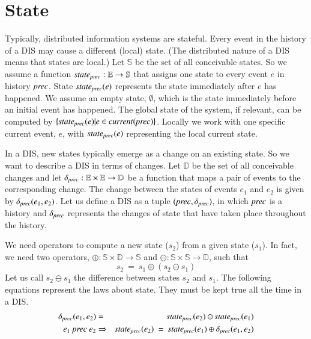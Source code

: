 \documentclass{elsarticle}
\def\id#1{\text{\it #1\/}}
\begin{document}
\section{State}
\label{sct:State}
	Typically, distributed information systems are stateful.
	Every event in the history of a DIS may cause a different (local) state.
	(The distributed nature of a DIS means that states are local.)
	Let $\mathbb S$ be the set of all conceivable states.
	So we assume a function $\id{state}_\id{prec}:\mathbb E\rightarrow\mathbb S$ that assigns one state to every event $e$ in history $\id{prec}$.
	State $\id{state}_\id{prec}(e)$ represents the state immediately after $e$ has happened.
	We assume an empty state, $\emptyset$, which is the state immediately before an initial event has happened.
	The global state of the system, if relevant, can be computed by $\{\id{state}_\id{prec}(e) | e\in\id{current}(\id{prec})\}$.
	Locally we work with one specific current event, $e$, with $\id{state}_\id{prec}(e)$ representing the local current state.

	In a DIS, new states typically emerge as a change on an existing state.
	So we want to describe a DIS in terms of changes.
	Let $\mathbb D$ be the set of all conceivable changes and let $\delta_\id{prec}:\mathbb E\times\mathbb E\rightarrow\mathbb D$
	be a function that maps a pair of events to the corresponding change.
	The change between the states of events $e_1$ and $e_2$ is given by $\delta_\id{prec}(e_1,e_2)$.
	Let us define a DIS as a tuple $(\id{prec},\delta_\id{prec})$,
	in which $\id{prec}$ is a history and
	$\delta_\id{prec}$ represents the changes of state that have taken place throughout the history.

	We need operators to compute a new state ($s_2$) from a given state ($s_1$).
	In fact, we need two operators, $\oplus:\mathbb S\times\mathbb D\rightarrow\mathbb S$ and $\ominus:\mathbb S\times\mathbb S\rightarrow\mathbb D$, such that
\begin{equation}
	s_2\ =\ s_1\oplus(s_2\ominus s_1)
\label{req:oplus and ominus}
\end{equation}
	Let us call $s_2\ominus s_1$ the difference between states $s_2$ and $s_1$.
	The following equations represent the laws about state.
	They must be kept true all the time in a DIS.
\begin{eqnarray}
	\delta_\id{prec}(e_1,e_2)&=&\id{state}_\id{prec}(e_2)\ominus\id{state}_\id{prec}(e_1)\\
	e_1\ \id{prec}\ e_2&\Rightarrow&\id{state}_\id{prec}(e_2)\ =\ \id{state}_\id{prec}(e_1)\oplus\delta_\id{prec}(e_1,e_2)
\end{eqnarray}
\end{document}
